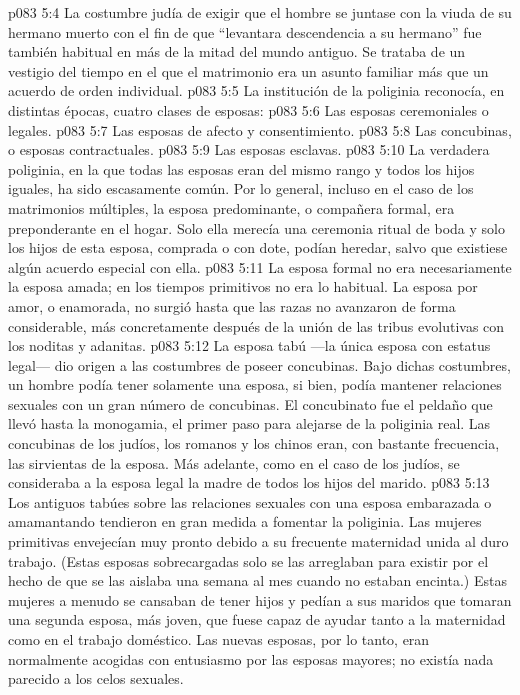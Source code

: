 \vs p083 5:4 La costumbre judía de exigir que el hombre se juntase con la viuda de su hermano muerto con el fin de que “levantara descendencia a su hermano” fue también habitual en más de la mitad del mundo antiguo. Se trataba de un vestigio del tiempo en el que el matrimonio era un asunto familiar más que un acuerdo de orden individual.
\vs p083 5:5 La institución de la poliginia reconocía, en distintas épocas, cuatro clases de esposas:
\vs p083 5:6 Las esposas ceremoniales o legales.
\vs p083 5:7 Las esposas de afecto y consentimiento.
\vs p083 5:8 Las concubinas, o esposas contractuales.
\vs p083 5:9 Las esposas esclavas.
\vs p083 5:10 \pc La verdadera poliginia, en la que todas las esposas eran del mismo rango y todos los hijos iguales, ha sido escasamente común. Por lo general, incluso en el caso de los matrimonios múltiples, la esposa predominante, o compañera formal, era preponderante en el hogar. Solo ella merecía una ceremonia ritual de boda y solo los hijos de esta esposa, comprada o con dote, podían heredar, salvo que existiese algún acuerdo especial con ella.
\vs p083 5:11 La esposa formal no era necesariamente la esposa amada; en los tiempos primitivos no era lo habitual. La esposa por amor, o enamorada, no surgió hasta que las razas no avanzaron de forma considerable, más concretamente después de la unión de las tribus evolutivas con los noditas y adanitas.
\vs p083 5:12 La esposa tabú ---la única esposa con estatus legal--- dio origen a las costumbres de poseer concubinas. Bajo dichas costumbres, un hombre podía tener solamente una esposa, si bien, podía mantener relaciones sexuales con un gran número de concubinas. El concubinato fue el peldaño que llevó hasta la monogamia, el primer paso para alejarse de la poliginia real. Las concubinas de los judíos, los romanos y los chinos eran, con bastante frecuencia, las sirvientas de la esposa. Más adelante, como en el caso de los judíos, se consideraba a la esposa legal la madre de todos los hijos del marido.
\vs p083 5:13 Los antiguos tabúes sobre las relaciones sexuales con una esposa embarazada o amamantando tendieron en gran medida a fomentar la poliginia. Las mujeres primitivas envejecían muy pronto debido a su frecuente maternidad unida al duro trabajo. (Estas esposas sobrecargadas solo se las arreglaban para existir por el hecho de que se las aislaba una semana al mes cuando no estaban encinta.) Estas mujeres a menudo se cansaban de tener hijos y pedían a sus maridos que tomaran una segunda esposa, más joven, que fuese capaz de ayudar tanto a la maternidad como en el trabajo doméstico. Las nuevas esposas, por lo tanto, eran normalmente acogidas con entusiasmo por las esposas mayores; no existía nada parecido a los celos sexuales.

